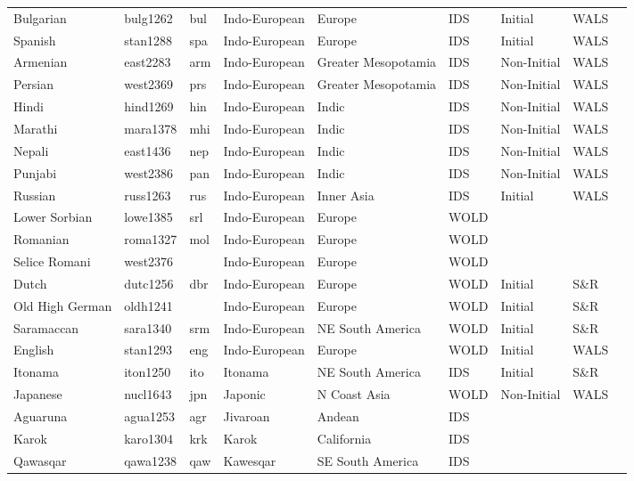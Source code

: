 \begin{longtable}{lllllllll}
  Bulgarian & bulg1262 & bul & Indo-European & Europe & IDS & Initial & WALS &  \\ 
  Spanish & stan1288 & spa & Indo-European & Europe & IDS & Initial & WALS &  \\ 
  Armenian  & east2283 & arm & Indo-European & Greater Mesopotamia & IDS & Non-Initial & WALS &  \\ 
  Persian & west2369 & prs & Indo-European & Greater Mesopotamia & IDS & Non-Initial & WALS &  \\ 
  Hindi & hind1269 & hin & Indo-European & Indic & IDS & Non-Initial & WALS &  \\ 
  Marathi & mara1378 & mhi & Indo-European & Indic & IDS & Non-Initial & WALS &  \\ 
  Nepali & east1436 & nep & Indo-European & Indic & IDS & Non-Initial & WALS &  \\ 
  Punjabi & west2386 & pan & Indo-European & Indic & IDS & Non-Initial & WALS &  \\ 
  Russian & russ1263 & rus & Indo-European & Inner Asia & IDS & Initial & WALS &  \\ 
  Lower Sorbian & lowe1385 & srl & Indo-European & Europe & WOLD &  &  &  \\ 
  Romanian & roma1327 & mol & Indo-European & Europe & WOLD &  &  &  \\ 
  Selice Romani & west2376 &  & Indo-European & Europe & WOLD &  &  &  \\ 
  Dutch & dutc1256 & dbr & Indo-European & Europe & WOLD & Initial & S\&R & \cite[]{} \\ 
  Old High German & oldh1241 &  & Indo-European & Europe & WOLD & Initial & S\&R & \cite[54]{axel_old-high-german-syntax2007.pdf} \\ 
  Saramaccan & sara1340 & srm & Indo-European & NE South America & WOLD & Initial & S\&R & \cite[30]{byrne_saramaccan1985.pdf} \\ 
  English & stan1293 & eng & Indo-European & Europe & WOLD & Initial & WALS &  \\ 
  Itonama & iton1250 & ito & Itonama & NE South America & IDS & Initial & S\&R & \cite[251,255]{crevels_itonama2012_o} \\ 
  Japanese & nucl1643 & jpn & Japonic & N Coast Asia & WOLD & Non-Initial & WALS &  \\ 
  Aguaruna & agua1253 & agr & Jivaroan & Andean & IDS &  &  &  \\ 
  Karok & karo1304 & krk & Karok & California & IDS &  &  &  \\ 
  Qawasqar & qawa1238 & qaw & Kawesqar & SE South America & IDS &  &  &  \\ 

\end{longtable}
